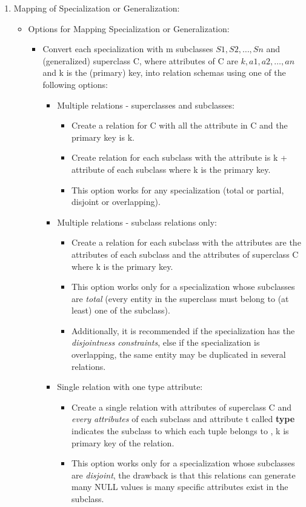 \documentclass[10pt]{article}
\newcommand{\tf}{\textbf}
\newcommand{\ti}{\textit}
\begin{document}
\begin{enumerate}
	\item Mapping of Specialization or Generalization: 
	\begin{itemize}
		\item Options for Mapping Specialization or Generalization:
		\begin{itemize}
			\item Convert each specialization with m subclasses ${S1, S2, \dots, Sn}$ and (generalized) superclass C, where attributes of C are ${k, a1, a2, \dots, an}$ and k is the (primary) key, into relation schemas using one of the following options:
			\begin{itemize}
				\item Multiple relations - superclasses and subclasses:
				\begin{itemize}
					\item Create a relation for C with all the attribute in C and the primary key is k.
					\item Create relation for each subclass with the attribute is k + attribute of each subclass where k is the primary key.
					\item This option works for any specialization (total or partial, disjoint or overlapping). 
				\end{itemize}

				\item Multiple relations - subclass relations only:
				\begin{itemize}
					\item Create a relation for each subclass with the attributes are the attributes of each subclass and the attributes of superclass C where k is the primary key.
					\item This option works only for a specialization whose subclasses are \ti{total} (every entity in the superclass must belong to (at least) one of the subclass).
					\item Additionally, it is recommended if the specialization has the \ti{disjointness constraints}, else if the specialization is overlapping, the same entity may be duplicated in several relations.
				\end{itemize}

				\item Single relation with one type attribute:
				\begin{itemize}
					\item Create a single relation with attributes of superclass C and \ti{every attributes} of each subclass and attribute t called \tf{type} indicates the subclass to which each tuple belongs to , k is primary key of the relation.
					\item This option works only for a specialization whose subclasses are \ti{disjoint}, the drawback is that this relations can generate many NULL values is many specific attributes exist in the subclass. 
				\end{itemize}


\end{itemize}
\end{itemize}
\end{itemize}
\end{enumerate}
\end{document}
